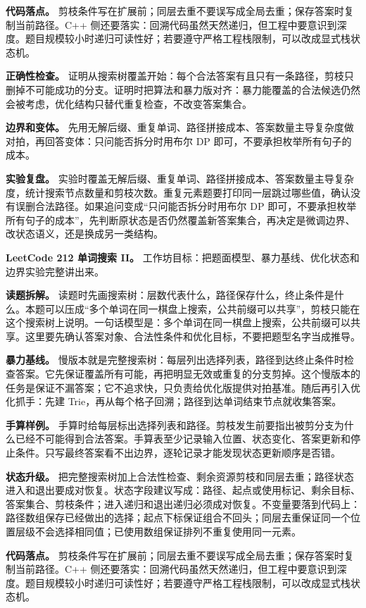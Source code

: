 \textbf{代码落点。} 剪枝条件写在扩展前；同层去重不要误写成全局去重；保存答案时复制当前路径。C++ 侧还要落实：回溯代码虽然天然递归，但工程中要意识到深度。题目规模较小时递归可读性好；若要遵守严格工程栈限制，可以改成显式栈状态机。

\textbf{正确性检查。} 证明从搜索树覆盖开始：每个合法答案有且只有一条路径，剪枝只删掉不可能成功的分支。证明时把算法和暴力版对齐：暴力能覆盖的合法候选仍然会被考虑，优化结构只替代重复检查，不改变答案集合。

\textbf{边界和变体。} 先用无解后缀、重复单词、路径拼接成本、答案数量主导复杂度做对拍，再回答变体：只问能否拆分时用布尔 DP 即可，不要承担枚举所有句子的成本。

\textbf{实验复盘。} 实验时覆盖无解后缀、重复单词、路径拼接成本、答案数量主导复杂度，统计搜索节点数量和剪枝次数。重复元素题要打印同一层跳过哪些值，确认没有误删合法路径。如果追问变成“只问能否拆分时用布尔 DP 即可，不要承担枚举所有句子的成本”，先判断原状态是否仍然覆盖新答案集合，再决定是微调边界、改状态语义，还是换成另一类结构。

\noindent\textbf{LeetCode 212 单词搜索 II。} 工作坊目标：把题面模型、暴力基线、优化状态和边界实验完整讲出来。

\textbf{读题拆解。} 读题时先画搜索树：层数代表什么，路径保存什么，终止条件是什么。本题可以压成“多个单词在同一棋盘上搜索，公共前缀可以共享”，剪枝只能在这个搜索树上说明。一句话模型是：多个单词在同一棋盘上搜索，公共前缀可以共享。这里要先确认答案对象、合法性条件和优化目标，不要把题型名字当成推导。

\textbf{暴力基线。} 慢版本就是完整搜索树：每层列出选择列表，路径到达终止条件时检查答案。它先保证覆盖所有可能，再把明显无效或重复的分支剪掉。这个慢版本的任务是保证不漏答案；它不追求快，只负责给优化版提供对拍基准。随后再引入优化抓手：先建 Trie，再从每个格子回溯；路径到达单词结束节点就收集答案。

\textbf{手算样例。} 手算时给每层标出选择列表和路径。剪枝发生前要指出被剪分支为什么已经不可能得到合法答案。手算表至少记录输入位置、状态变化、答案更新和停止条件。只写最终答案看不出边界，逐轮记录才能发现状态更新顺序是否错。

\textbf{状态升级。} 把完整搜索树加上合法性检查、剩余资源剪枝和同层去重；路径状态进入和退出要成对恢复。状态字段建议写成：路径、起点或使用标记、剩余目标、答案集合、剪枝条件；进入递归和退出递归必须成对恢复。不变量要落到代码上：路径数组保存已经做出的选择；起点下标保证组合不回头；同层去重保证同一个位置层级不会选择相同值；已使用数组保证排列不重复使用同一元素。

\textbf{代码落点。} 剪枝条件写在扩展前；同层去重不要误写成全局去重；保存答案时复制当前路径。C++ 侧还要落实：回溯代码虽然天然递归，但工程中要意识到深度。题目规模较小时递归可读性好；若要遵守严格工程栈限制，可以改成显式栈状态机。

